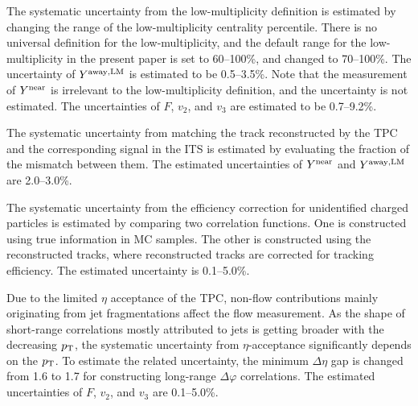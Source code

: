 The systematic uncertainty from the low-multiplicity definition is estimated by changing the range of the low-multiplicity centrality percentile. There is no universal definition for the low-multiplicity, and the default range for the low-multiplicity in the present paper is set to 60--100\%, and changed to 70--100\%. The uncertainty of $Y^{\rm{away,LM}}$ is estimated to be 0.5--3.5\%. Note that the measurement of $Y^{\rm{near}}$ is irrelevant to the low-multiplicity definition, and the uncertainty is not estimated. The uncertainties of $F$, $v_{2}$, and $v_{3}$ are estimated to be 0.7--9.2\%.

The systematic uncertainty from matching the track reconstructed by the TPC and the corresponding signal in the ITS is estimated by evaluating the fraction of the mismatch between them. The estimated uncertainties of $Y^{\rm{near}}$ and $Y^{\rm{away,LM}}$ are 2.0--3.0\%.

The systematic uncertainty from the efficiency correction for unidentified charged particles is estimated by comparing two correlation functions. One is constructed using true information in MC samples. The other is constructed using the reconstructed tracks, where reconstructed tracks are corrected for tracking efficiency. The estimated uncertainty is 0.1--5.0\%.

Due to the limited $\eta$ acceptance of the TPC, non-flow contributions mainly originating from jet fragmentations affect the flow measurement. As the shape of short-range correlations mostly attributed to jets is getting broader with the decreasing $p_\mathrm{T}$, the systematic uncertainty from $\eta$-acceptance significantly depends on the $p_{\rm{T}}$. To estimate the related uncertainty, the minimum $\Delta\eta$ gap is changed from 1.6 to 1.7 for constructing long-range $\Delta\varphi$ correlations.  The estimated uncertainties of $F$, $v_{2}$, and $v_{3}$ are 0.1--5.0\%.





